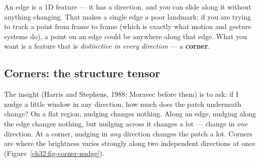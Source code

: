 An edge is a 1D feature --- it has a direction, and you can slide along it
without anything changing. That makes a single edge a poor landmark: if you are
trying to track a point from frame to frame (which is exactly what motion and
gesture systems do), a point on an edge could be anywhere along that edge. What
you want is a feature that is \emph{distinctive in every direction} --- a
\textbf{corner}.

\subsection{Corners: the structure tensor}

The insight (Harris and Stephens, 1988; Moravec before them) is to ask: if I
nudge a little window in any direction, how much does the patch underneath
change? On a flat region, nudging changes nothing. Along an edge, nudging along
the edge changes nothing, but nudging across it changes a lot --- change in
\emph{one} direction. At a corner, nudging in \emph{any} direction changes the
patch a lot. Corners are where the brightness varies strongly along two
independent directions at once (Figure~\ref{ch32:fig-corner-nudge}).


